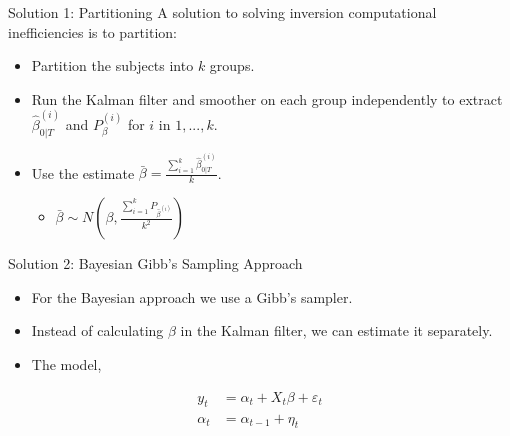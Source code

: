 \documentclass[
  ignorenonframetext,
]{beamer}
\providecommand{\tightlist}{%
  \setlength{\itemsep}{0pt}\setlength{\parskip}{0pt}}
\begin{document}
\begin{frame}{Solution 1: Partitioning}
\protect\hypertarget{solution-1-partitioning}{}
A solution to solving inversion computational inefficiencies is to
partition:

\begin{itemize}
\tightlist
\item
  Partition the subjects into \(k\) groups.
\item
  Run the Kalman filter and smoother on each group independently to
  extract \(\hat\beta_{0|T}^{(i)}\) and \(P_{\beta}^{(i)}\) for \(i\) in
  \(1, ..., k\).
\item
  Use the estimate
  \(\bar\beta = \frac{\sum_{i=1}^k\hat\beta_{0|T}^{(i)}}{k}\).

  \begin{itemize}
  \tightlist
  \item
    \(\bar \beta \sim N(\beta, \frac{\sum_{i=1}^kP_{\hat\beta^{(i)}}}{k^2})\)
  \end{itemize}
\end{itemize}
\end{frame}

\begin{frame}{Solution 2: Bayesian Gibb's Sampling Approach}
\protect\hypertarget{solution-2-bayesian-gibbs-sampling-approach}{}
\begin{itemize}
\tightlist
\item
  For the Bayesian approach we use a Gibb's sampler.
\item
  Instead of calculating \(\beta\) in the Kalman filter, we can estimate
  it separately.
\item
  The model,
\end{itemize}

\begin{equation*}
\begin{aligned}
y_t &= \alpha_t + X_t \beta +\varepsilon_t\\
\alpha_t &= \alpha_{t-1} + \eta_t
\end{aligned}
\end{equation*}
\end{frame}
\end{document}
